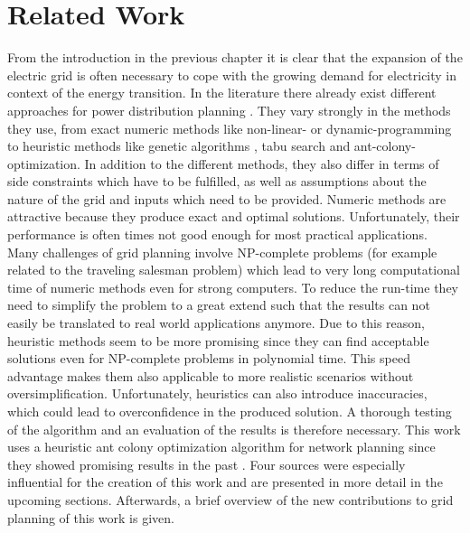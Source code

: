 \chapter{Related Work}\label{chap:relatedwork}

From the introduction in the previous chapter it is clear that the expansion of the electric grid is often necessary to cope with the growing demand for electricity in context of the energy transition. In the literature there already exist different approaches for power distribution planning \cite{review}. They vary strongly in the methods they use, from exact numeric methods like non-linear- or dynamic-programming \cite{non_linear_programming, dynamic_programming} to heuristic methods like genetic algorithms \cite{genetic_algo}, tabu search \cite{tabu_search} and ant-colony-optimization. In addition to the different methods, they also differ in terms of side constraints which have to be fulfilled, as well as assumptions about the nature of the grid and inputs which need to be provided. Numeric methods are attractive because they produce exact and optimal solutions. Unfortunately, their performance is often times not good enough for most practical applications. Many challenges of grid planning involve NP-complete problems (for example related to the traveling salesman problem) which lead to very long computational time of numeric methods even for strong computers. To reduce the run-time they need to simplify the problem to a great extend such that the results can not easily be translated to real world applications anymore. Due to this reason, heuristic methods seem to be more promising since they can find acceptable solutions even for NP-complete problems in polynomial time. This speed advantage makes them also applicable to more realistic scenarios without oversimplification. Unfortunately, heuristics can also introduce inaccuracies, which could lead to overconfidence in the produced solution. A thorough testing of the algorithm and an evaluation of the results is therefore necessary. This work uses a heuristic ant colony optimization algorithm for network planning since they showed promising results in the past \cite{ant_system}\cite{bonabeau1999swarm}\cite{ant_coloy_system}. Four sources were especially influential for the creation of this work and are presented in more detail in the upcoming sections. Afterwards, a brief overview of the new contributions to grid planning of this work is given.

